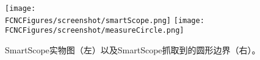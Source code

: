 \begin{figure}[H]
\centering
\texttt{[image: \\FCNCFigures/screenshot/smartScope.png]}
\texttt{[image: \\FCNCFigures/screenshot/measureCircle.png]}
\caption{SmartScope实物图（左）以及SmartScope抓取到的圆形边界（右）。}
\label{fig:measureCircle}
\end{figure}